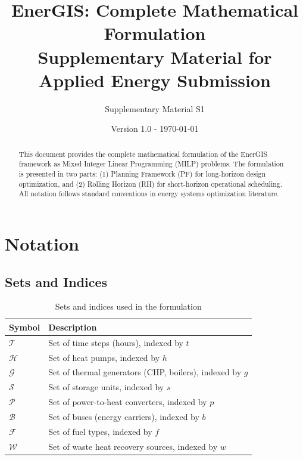 \documentclass[11pt]{article}
\title{EnerGIS: Complete Mathematical Formulation\\
\large Supplementary Material for Applied Energy Submission}
\author{Supplementary Material S1}
\date{Version 1.0 - \today}
\begin{document}
\maketitle

\begin{abstract}
This document provides the complete mathematical formulation of the EnerGIS framework as Mixed Integer Linear Programming (MILP) problems. The formulation is presented in two parts: (1) Planning Framework (PF) for long-horizon design optimization, and (2) Rolling Horizon (RH) for short-horizon operational scheduling. All notation follows standard conventions in energy systems optimization literature.
\end{abstract}

\tableofcontents
\newpage

\section{Notation}

\subsection{Sets and Indices}

\begin{table}[h]
\centering
\begin{tabular}{ll}
\toprule
\textbf{Symbol} & \textbf{Description} \\
\midrule
$\mathcal{T}$ & Set of time steps (hours), indexed by $t$ \\
$\mathcal{H}$ & Set of heat pumps, indexed by $h$ \\
$\mathcal{G}$ & Set of thermal generators (CHP, boilers), indexed by $g$ \\
$\mathcal{S}$ & Set of storage units, indexed by $s$ \\
$\mathcal{P}$ & Set of power-to-heat converters, indexed by $p$ \\
$\mathcal{B}$ & Set of buses (energy carriers), indexed by $b$ \\
$\mathcal{F}$ & Set of fuel types, indexed by $f$ \\
$\mathcal{W}$ & Set of waste heat recovery sources, indexed by $w$ \\
\bottomrule
\end{tabular}
\caption{Sets and indices used in the formulation}
\label{tab:sets}
\end{table}
\end{document}
